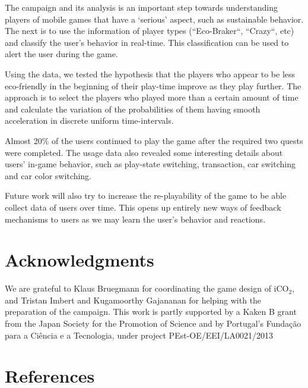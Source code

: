 \documentclass[preprint,authoryear,12pt]{elsarticle}
\begin{document}
The campaign and its analysis is an important step towards understanding players of mobile games that have a `serious' aspect, such as sustainable behavior. The next is to use the information of player types (``Eco-Braker``, ``Crazy``, etc) and classify the user's behavior in real-time. This classification can be used to alert the user during the game.

Using the data, we tested the hypothesis that the players who appear to be less eco-friendly in the beginning of their play-time improve as they play further. The approach is to select the players who played more than a certain amount of time and calculate the variation of the probabilities of them having smooth acceleration in discrete uniform time-intervals.

Almost 20\% of the users continued to play the game after the required two quests were completed.
The usage data also revealed some interesting details about users' in-game behavior, such as play-state switching, transaction, car switching and car color switching.

Future work will also try to increase the re-playability of the game to be able collect data of users over time. This opens up entirely new ways of feedback mechanisms to users as we may learn the user's behavior and reactions.


\section{Acknowledgments}
We are grateful to Klaus Bruegmann for coordinating the game design of iCO$_2$, and Tristan Imbert and Kugamoorthy Gajananan for helping with the preparation of the campaign.
This work is partly supported by a Kaken B grant from the Japan Society for the Promotion of Science and by Portugal’s Fundação para a Ciência e a Tecnologia, under project
PEst-OE/EEI/LA0021/2013



\section*{References}




\end{document}
